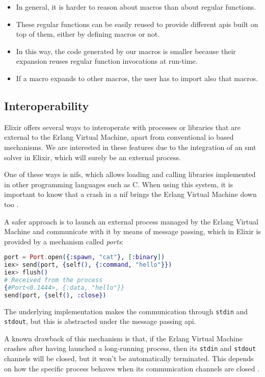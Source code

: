 \begin{itemize}
  \item In general, it is harder to reason about macros than about regular functions.
  \item These regular functions can be easily reused to provide different \gls{api}s built on top of them, either by defining macros or not.
  \item In this way, the code generated by our macros is smaller because their expansion reuses regular function invocations at run-time.
  \item If a macro expands to other macros, the user has to import also that macros.
\end{itemize}

\subsection{Interoperability}

Elixir offers several ways to interoperate with processes or libraries that are
external to the Erlang Virtual Machine, apart from conventional \gls{io} based
mechanisms. We are interested in these features due to the integration of an
\acrshort{smt} solver in Elixir, which will surely be an external process.

One of these ways is \gls{nif}s, which allows loading and calling libraries
implemented in other programming languages such as C. When using this system, it
is important to know that a crash in a \gls{nif} brings the Erlang Virtual 
Machine down too \citep{ErlangDocs}.

A safer approach is to launch an external process managed by the Erlang Virtual
Machine and communicate with it by means of message passing, which in Elixir is
provided by a mechanism called \textit{ports}:

\begin{lstlisting}[language=elixir,numbers=none,frame=none]
port = Port.open({:spawn, "cat"}, [:binary])
iex> send(port, {self(), {:command, "hello"}})
iex> flush()
# Received from the process
{#Port<0.1444>, {:data, "hello"}} 
send(port, {self(), :close})
\end{lstlisting}

The underlying implementation makes the communication through \verb|stdin| and 
\verb|stdout|, but this is abstracted under the message passing \gls{api}.

A known drawback of this mechanism is that, if the Erlang Virtual Machine
crashes after having launched a long-running process, then its \verb|stdin| and
\verb|stdout| channels will be closed, but it won't be automatically terminated.
This depends on how the specific process behaves when its communication channels
are closed \citep{ElixirDocs}.

